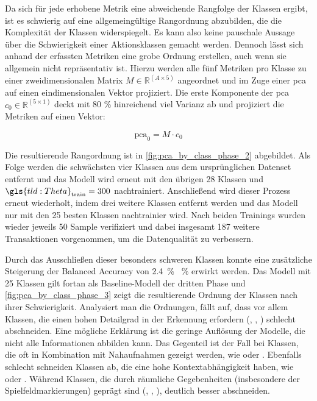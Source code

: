 
Da sich für jede erhobene Metrik eine abweichende Rangfolge der Klassen ergibt, ist es schwierig auf eine allgemeingültige Rangordnung abzubilden, die die Komplexität der Klassen widerspiegelt.
Es kann also keine pauschale Aussage über die Schwierigkeit einer Aktionsklassen gemacht werden.
Dennoch lässt sich anhand der erfassten Metriken eine grobe Ordnung erstellen, auch wenn sie allgemein nicht repräsentativ ist.
Hierzu werden alle fünf Metriken pro Klasse zu einer zweidimensionalen Matrix $M \in \mathbb{R}^{(A \times 5)}$ angeordnet und im Zuge einer \gls{pca} auf einen eindimensionalen Vektor projiziert.
Die erste Komponente der \gls{pca} $c_0 \in \mathbb{R}^{(5 \times 1)}$ deckt mit 80 \% hinreichend viel Varianz ab und projiziert die Metriken auf einen Vektor:

\begin{equation}
    \label{eq:pca}
    \text{pca}_0 = M \cdot c_0
\end{equation}

Die resultierende Rangordnung ist in \autoref{fig:pca_by_class_phase_2} abgebildet.
Als Folge werden die schwächsten vier Klassen aus dem ursprünglichen Datenset entfernt und das Modell wird erneut mit den übrigen 28 Klassen und $\gls{tld:Theta}_\text{train} = 300$ nachtrainiert.
Anschließend wird dieser Prozess erneut wiederholt, indem drei weitere Klassen entfernt werden und das Modell nur mit den 25 besten Klassen nachtrainier wird.
Nach beiden Trainings wurden wieder jeweils 50 Sample verifiziert und dabei insgesamt 187 weitere Transaktionen vorgenommen, um die Datenqualität zu verbessern.

Durch das Ausschließen dieser besonders schweren Klassen konnte eine zusätzliche Steigerung der Balanced Accuracy von 2.4~\% ~\% erwirkt werden.
Das Modell mit 25 Klassen gilt fortan als Baseline-Modell der dritten Phase und \autoref{fig:pca_by_class_phase_3} zeigt die resultierende Ordnung der Klassen nach ihrer Schwierigkeit.
Analysiert man die Ordnungen, fällt auf, dass vor allem Klassen, die einen hohen Detailgrad in der Erkennung erfordern (, , ) schlecht abschneiden.
Eine mögliche Erklärung ist die geringe Auflösung der Modelle, die nicht alle Informationen abbilden kann.
Das Gegenteil ist der Fall bei Klassen, die oft in Kombination mit Nahaufnahmen gezeigt werden, wie  oder .
Ebenfalls schlecht schneiden Klassen ab, die eine hohe Kontextabhängigkeit haben, wie  oder .
Während Klassen, die durch räumliche Gegebenheiten (insbesondere der Spielfeldmarkierungen) geprägt sind (, , ), deutlich besser abschneiden.

